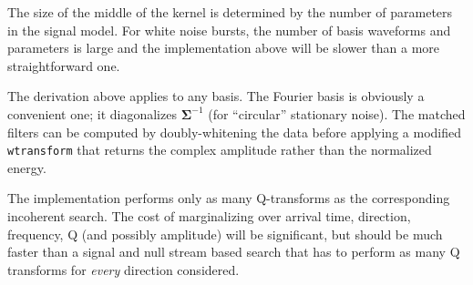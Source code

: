 \documentclass{article}
\begin{document}
The size of the middle of the kernel is determined by the number of parameters in the signal model.  For white noise bursts, the number of basis waveforms and parameters is large and the implementation above will be slower than a more straightforward one.

The derivation above applies to any basis.  The Fourier basis is obviously a convenient one; it diagonalizes $\mathbf{\Sigma}^{-1}$ (for ``circular'' stationary noise).  The matched filters can be computed by doubly-whitening the data before applying a modified \texttt{wtransform} that returns the complex amplitude rather than the normalized energy.

The implementation performs only as many Q-transforms as the corresponding incoherent search.  The cost of marginalizing over arrival time, direction, frequency, Q (and possibly amplitude) will be significant, but should be much faster than a signal and null stream based search that has to perform as many Q transforms for \emph{every} direction considered.
\end{document}
